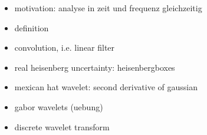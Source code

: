 \begin{itemize}
    \item motivation: analyse in zeit und frequenz gleichzeitig
    \item definition \cite[chpt 4.3, (4.30)]{mallat2008wavelets}
    \item convolution, i.e. linear filter
    \item real heisenberg uncertainty: heisenbergboxes
    \item mexican hat wavelet: second derivative of gaussian
    \item gabor wavelets (uebung)
    \item discrete wavelet transform \cite[ch 4.3.3]{mallat2008wavelets}
\end{itemize}